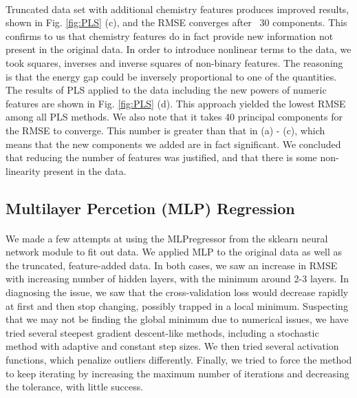 \documentclass[11pt]{article}
\begin{document}
\paragraph{}
Truncated data set with additional chemistry features produces improved results, shown in Fig. \ref{fig:PLS} (c), and the RMSE converges after ~30 components. This confirms to us that chemistry features do in fact provide new information not present in the original data. In order to introduce nonlinear terms to the data, we took squares, inverses and inverse squares of non-binary features. The reasoning is that the energy gap could be inversely proportional to one of the quantities. %
The results of PLS applied to the data including the new powers of numeric features are shown in Fig. \ref{fig:PLS} (d). This approach yielded the lowest RMSE among all PLS methods. We also note that it takes 40 principal components for the RMSE to converge. This number is greater than that in (a) - (c), which means that the new components we added are in fact significant. We concluded that reducing the number of features was justified, and that there is some non-linearity present in the data.

\subsection{Multilayer Percetion (MLP) Regression}
\paragraph{}
We made a few attempts at using the MLPregressor from the sklearn neural network module to fit out data. We applied MLP to the original data as well as the truncated, feature-added data. In both cases, we saw an increase in RMSE with increasing number of hidden layers, with the minimum around 2-3 layers. In diagnosing the issue, we saw that the cross-validation loss would decrease rapidly at first and then stop changing, possibly trapped in a local minimum. Suspecting that we may not be finding the global minimum due to numerical issues, we have tried several steepest gradient descent-like methods, including a stochastic method with adaptive and constant step sizes. We then tried several activation functions, which penalize outliers differently. Finally, we tried to force the method to keep iterating by increasing the maximum number of iterations and decreasing the tolerance, with little success. 
\end{document}
